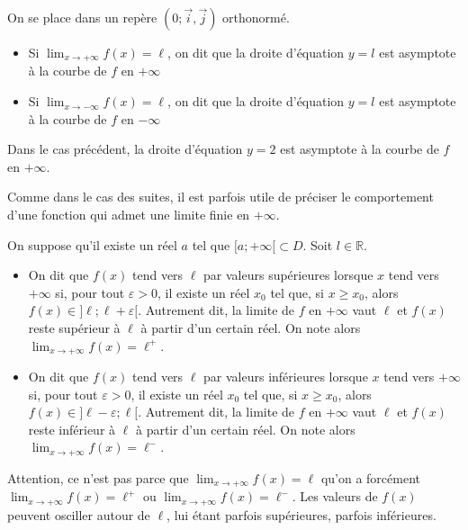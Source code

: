 \documentclass[11pt,fleqn, openany]{book} %
\begin{document}
\begin{definition} On se place dans un repère $(0;\vec i, \vec j)$ orthonormé.
\begin{itemize}
\item Si $\displaystyle \lim_{x \to +\infty} f(x)=\ell$, on dit que la droite d'équation $y=l$ est asymptote à la courbe de $f$ en $+\infty$
\item Si $\displaystyle \lim_{x \to -\infty} f(x)=\ell$, on dit que la droite d'équation $y=l$ est asymptote à la courbe de $f$ en $-\infty$\end{itemize} \end{definition}

\begin{example}Dans le cas précédent, la droite d'équation $y=2$ est asymptote à la courbe de $f$ en $+\infty$.\end{example}


Comme dans le cas des suites, il est parfois utile de préciser le comportement d'une fonction qui admet une limite finie en $+\infty$.

\begin{definition}On suppose qu'il existe un réel $a$ tel que $[a;+\infty [ \subset D$. Soit $l\in\mathbb{R}$.
\begin{itemize}
\item On dit que $f(x)$ tend vers $\ell$ par valeurs supérieures lorsque $x$ tend vers $+\infty$ si, pour tout $\varepsilon>0$, il existe un réel $x_0$ tel que, si $x \geqslant x_0$, alors $f(x) \in ]\ell ; \ell+\varepsilon [$. Autrement dit, la limite de $f$ en $+\infty$ vaut $\ell$ et $f(x)$ reste supérieur à $\ell$ à partir d'un certain réel. On note alors $\displaystyle \lim_{x \to +\infty} f(x)=\ell^+$.
\item On dit que $f(x)$ tend vers $\ell$ par valeurs inférieures lorsque $x$ tend vers $+\infty$ si, pour tout $\varepsilon>0$, il existe un réel $x_0$ tel que, si $x \geqslant x_0$, alors $f(x) \in ]\ell-\varepsilon ; \ell [$. Autrement dit, la limite de $f$ en $+\infty$ vaut $\ell$ et $f(x)$ reste inférieur à $\ell$ à partir d'un certain réel. On note alors $\displaystyle \lim_{x \to +\infty} f(x)=\ell^-$.
\end{itemize}\end{definition}

Attention, ce n'est pas parce que $\displaystyle \lim_{x \to +\infty} f(x)=\ell$ qu'on a forcément $\displaystyle \lim_{x \to +\infty} f(x)=\ell^+$ ou $\displaystyle \lim_{x \to +\infty} f(x)=\ell^-$. Les valeurs de $f(x)$ peuvent osciller autour de $\ell$, lui étant parfois supérieures, parfois inférieures.
\end{document}
